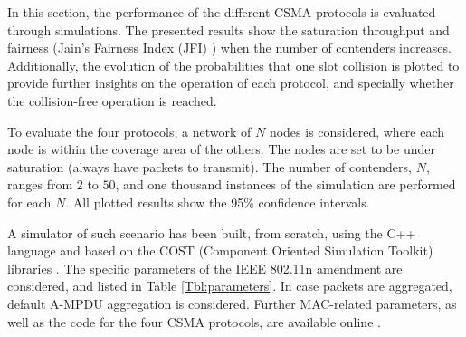 \documentclass[conference]{IEEEtran}
\begin{document}
In this section, the performance of the different CSMA protocols is evaluated through simulations. The presented results show the saturation throughput and fairness (Jain's Fairness Index (JFI) \cite{jain1984quantitative}) when the number of contenders increases. Additionally, the evolution of the probabilities that one slot collision is plotted to provide further insights on the operation of each protocol, and specially whether the collision-free operation is reached. 


To evaluate the four protocols, a network of $N$ nodes is considered, where each node is within the coverage area of the others. The nodes are set to be under saturation (always have packets to transmit). The number of contenders, $N$, ranges from $2$ to $50$, and one thousand instances of the simulation are performed for each $N$. All plotted results show the 95\% confidence intervals. 

A simulator of such scenario has been built, from scratch, using the C++ language and based on the COST (Component Oriented Simulation Toolkit) libraries \cite{yucesan2002cost}. The specific parameters of the IEEE 802.11n amendment \cite{IEEE80211n} are considered, and listed in Table \ref{Tbl:parameters}. In case packets are aggregated, default A-MPDU aggregation is considered. Further MAC-related parameters, as well as the code for the four CSMA protocols, are available online \cite{SanabriaSimulatorECA2012}.
\end{document}
